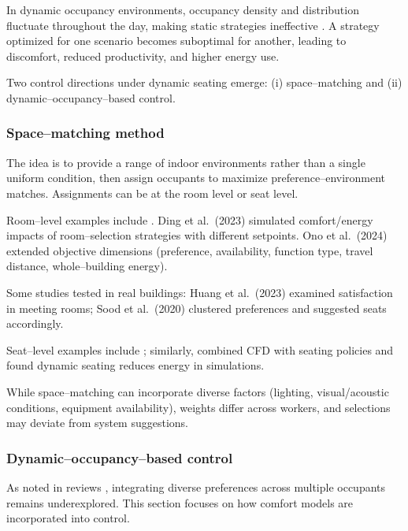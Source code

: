 In dynamic occupancy environments, occupancy density and distribution fluctuate throughout the day, making static strategies ineffective \cite{ono_occupant-centric_2024,sood_spacematch_2020}.
A strategy optimized for one scenario becomes suboptimal for another, leading to discomfort, reduced productivity, and higher energy use.


Two control directions under dynamic seating emerge: (i) space–matching and (ii) dynamic–occupancy–based control.

\subsubsection{Space–matching method}

The idea is to provide a range of indoor environments rather than a single uniform condition, then assign occupants to maximize preference–environment matches.
Assignments can be at the room level or seat level.

Room–level examples include \cite{sood_spacematch_2020,ding_enhancing_2023,nagarathinam_user_2021,huang_space-matching_2025,huang_improving_2023}.
Ding et al.~(2023) \cite{ding_enhancing_2023} simulated comfort/energy impacts of room–selection strategies with different setpoints.
Ono et al.~(2024) \cite{ono_occupant-centric_2024} extended objective dimensions (preference, availability, function type, travel distance, whole–building energy).

Some studies tested in real buildings: Huang et al.~(2023) \cite{huang_improving_2023} examined satisfaction in meeting rooms; Sood et al.~(2020) \cite{sood_spacematch_2020} clustered preferences and suggested seats accordingly.

Seat–level examples include \cite{nagarathinam_user_2021}; similarly, \cite{huang_space-matching_2025} combined CFD with seating policies and found dynamic seating reduces energy in simulations.

While space–matching can incorporate diverse factors (lighting, visual/acoustic conditions, equipment availability), weights differ across workers, and selections may deviate from system suggestions.

\subsubsection{Dynamic–occupancy–based control}

As noted in reviews \cite{xie_review_2020}, integrating diverse preferences across multiple occupants remains underexplored.
This section focuses on how comfort models are incorporated into control.

